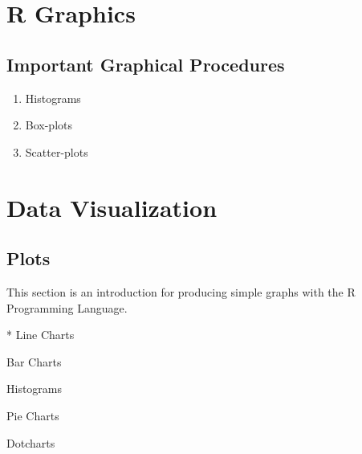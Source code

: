 



\chapter { R Graphics}

\section{Important Graphical Procedures}
\begin{enumerate}
\item Histograms
\item Box-plots
\item Scatter-plots
\end{enumerate}


\newpage


\chapter{Data Visualization}
\section{Plots}
This section is an introduction for producing simple graphs with
the R Programming Language.

*  Line Charts  \item Bar Charts \item Histograms \item Pie
	Charts \item Dotcharts
